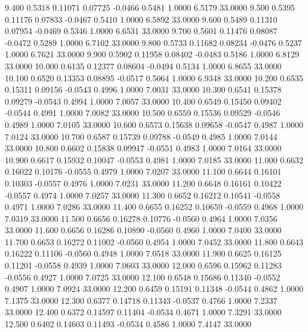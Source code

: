    9.400   0.5318   0.11071   0.07725  -0.0466   0.5481   1.0000   6.5179  33.0000
   9.500   0.5395   0.11176   0.07833  -0.0467   0.5410   1.0000   6.5892  33.0000
   9.600   0.5489   0.11310   0.07954  -0.0469   0.5346   1.0000   6.6531  33.0000
   9.700   0.5601   0.11476   0.08087  -0.0472   0.5289   1.0000   6.7102  33.0000
   9.800   0.5733   0.11682   0.08234  -0.0476   0.5237   1.0000   6.7621  33.0000
   9.900   0.5902   0.11958   0.08402  -0.0483   0.5186   1.0000   6.8129  33.0000
  10.000   0.6135   0.12377   0.08604  -0.0494   0.5134   1.0000   6.8655  33.0000
  10.100   0.6520   0.13353   0.08895  -0.0517   0.5064   1.0000   6.9348  33.0000
  10.200   0.6535   0.15311   0.09156  -0.0543   0.4996   1.0000   7.0031  33.0000
  10.300   0.6541   0.15378   0.09279  -0.0543   0.4994   1.0000   7.0057  33.0000
  10.400   0.6549   0.15450   0.09402  -0.0544   0.4991   1.0000   7.0082  33.0000
  10.500   0.6559   0.15536   0.09529  -0.0546   0.4989   1.0000   7.0105  33.0000
  10.600   0.6573   0.15638   0.09658  -0.0547   0.4987   1.0000   7.0124  33.0000
  10.700   0.6587   0.15739   0.09788  -0.0549   0.4985   1.0000   7.0144  33.0000
  10.800   0.6602   0.15838   0.09917  -0.0551   0.4983   1.0000   7.0164  33.0000
  10.900   0.6617   0.15932   0.10047  -0.0553   0.4981   1.0000   7.0185  33.0000
  11.000   0.6632   0.16022   0.10176  -0.0555   0.4979   1.0000   7.0207  33.0000
  11.100   0.6644   0.16101   0.10303  -0.0557   0.4976   1.0000   7.0231  33.0000
  11.200   0.6648   0.16161   0.10422  -0.0557   0.4974   1.0000   7.0257  33.0000
  11.300   0.6652   0.16212   0.10541  -0.0558   0.4971   1.0000   7.0286  33.0000
  11.400   0.6655   0.16252   0.10659  -0.0559   0.4968   1.0000   7.0319  33.0000
  11.500   0.6656   0.16278   0.10776  -0.0560   0.4964   1.0000   7.0356  33.0000
  11.600   0.6656   0.16286   0.10890  -0.0560   0.4960   1.0000   7.0400  33.0000
  11.700   0.6653   0.16272   0.11002  -0.0560   0.4954   1.0000   7.0452  33.0000
  11.800   0.6643   0.16222   0.11106  -0.0560   0.4948   1.0000   7.0518  33.0000
  11.900   0.6625   0.16125   0.11201  -0.0558   0.4939   1.0000   7.0603  33.0000
  12.000   0.6596   0.15962   0.11283  -0.0556   0.4927   1.0000   7.0725  33.0000
  12.100   0.6548   0.15686   0.11340  -0.0552   0.4907   1.0000   7.0924  33.0000
  12.200   0.6459   0.15191   0.11348  -0.0544   0.4862   1.0000   7.1375  33.0000
  12.300   0.6377   0.14718   0.11343  -0.0537   0.4766   1.0000   7.2337  33.0000
  12.400   0.6372   0.14597   0.11404  -0.0534   0.4671   1.0000   7.3291  33.0000
  12.500   0.6402   0.14603   0.11493  -0.0534   0.4586   1.0000   7.4147  33.0000
